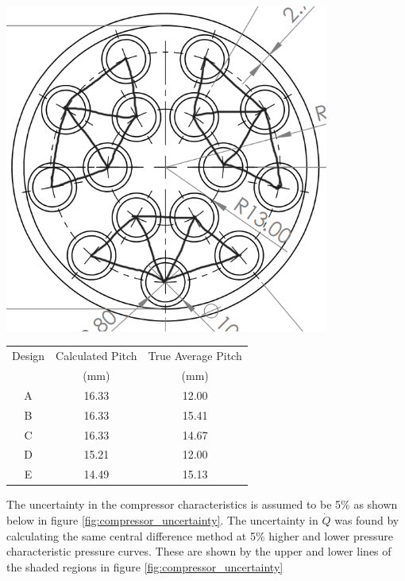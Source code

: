 \documentclass{article}
\begin{document}
\begin{minipage}[t]{0.29\textwidth}
    \centering
    \includegraphics[width=0.8\textwidth]{tube_network.png}
    \label{fig:tube_network}
\end{minipage}
\begin{minipage}[t]{0.69\textwidth}
    \centering
    \begin{tabular}{c|c|c}
        Design & Calculated Pitch & True Average Pitch \\
        & (mm) & (mm) \\
        \hline
        A & 16.33 & 12.00 \\
        B & 16.33 & 15.41 \\
        C & 16.33 & 14.67 \\
        D & 15.21 & 12.00 \\
        E & 14.49 & 15.13 \\
    \end{tabular}
    \label{tab:pitch_comparison}
\end{minipage}

The uncertainty in the compressor characteristics is assumed to be 5\% as shown below in figure \ref{fig:compressor_uncertainty}.
The uncertainty in $\dot{Q}$ was found by calculating the same central difference method at 5\% higher and lower pressure characteristic pressure curves.
These are shown by the upper and lower lines of the shaded regions in figure \ref{fig:compressor_uncertainty}
\end{document}
